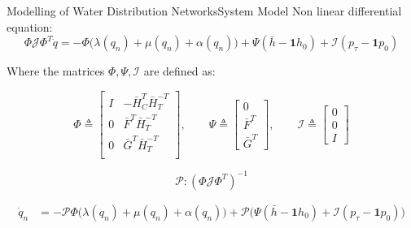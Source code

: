 \begin{frame}{Modelling of Water Distribution Networks}{System Model}
	Non linear differential equation:
	\begin{equation}
		\Phi\mathcal{J}\Phi^T \dot{q} = -\Phi\Big(\lambda(q_n)+\mu(q_n)+\alpha(q_n)\Big) + \Psi(\bar{h}-\mathbf{1}h_0) + \mathcal{I}(p_{\tau}-\mathbf{1}p_0)
	\end{equation}

	Where the matrices $\Phi, \Psi, \mathcal{I}$ are defined as:
	
	\begin{equation}
		\Phi \triangleq 
		\begin{bmatrix} 
			I & -\bar{H}_C^T\bar{H}_T^{-T} \\ 0 & \bar{F}^T\bar{H}_T^{-T} \\ 0  & \bar{G}^T\bar{H}_T^{-T} \\ 
		\end{bmatrix}
		, \qquad
		\Psi \triangleq
		\begin{bmatrix}
			0 \\ \bar{F}^T \\ \bar{G}^T
		\end{bmatrix}
		, \qquad
		\mathcal{I} \triangleq
		\begin{bmatrix}
			0 \\ 0 \\ I
		\end{bmatrix}
	\end{equation}

	\begin{equation}
		\mathcal{P}: (\Phi \mathcal{J} \Phi^T)^{-1}
	\end{equation}
	
	
	
	\begin{equation}\label{eq:NonLinearModelSimplified}
		\begin{split}
			\dot{q}_n &=  -\mathcal{P}\Phi\Big(\lambda(q_n)+\mu(q_n)+\alpha(q_n)\Big) + \mathcal{P}\Big(\Psi(\bar{h}-\mathbf{1}h_0) + \mathcal{I}(p_{\tau}-\mathbf{1}p_0)\Big) 
		\end{split}	
	\end{equation}


\end{frame}


